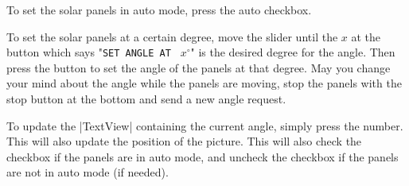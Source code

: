 To set the solar panels in auto mode, press the auto checkbox.


To set the solar panels at a certain degree, move the slider until the $x$ at the button which says "\verb|SET ANGLE AT | $x^{\circ}$" is the desired degree for the angle.
Then press the button to set the angle of the panels at that degree.
May you change your mind about the angle while the panels are moving, stop the panels with the stop button at the bottom and send a new angle request.

To update the |TextView| containing the current angle, simply press the number.
This will also update the position of the picture.
This will also check the checkbox if the panels are in auto mode, and uncheck the checkbox if the panels are not in auto mode (if needed).
